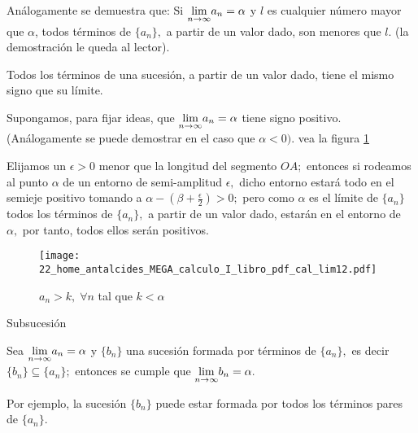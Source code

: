Análogamente se demuestra que: Si $\Lim{a_{n}}n{\infty}=\alpha$ y
$l$ es cualquier número mayor que $\alpha$, todos términos de $\{a_{n}\},$
a partir de un valor dado, son menores que $l$. (la demostración
le queda al lector).

\begin{propiedad}{}

Todos los términos de una sucesión, a partir de un valor dado, tiene
el mismo signo que su límite. 

\end{propiedad}

\begin{dems}

Supongamos, para fijar ideas, que $\Lim{a_{n}}n{\infty}=\alpha$ tiene
signo positivo. (Análogamente se puede demostrar en el caso que $\alpha<0).$
vea la figura \ref{fig:cal_lim12}

Elijamos un $\epsilon>0$ menor que la longitud del segmento $OA;$
entonces si rodeamos al punto $\alpha$ de un entorno de semi-amplitud
$\epsilon,$ dicho entorno estará todo en el semieje positivo tomando
a $\alpha-(\beta+\frac{\epsilon}{2})>0;$ pero como $\alpha$ es el
límite de $\{a_{n}\}$ todos los términos de $\{a_{n}\},$ a partir
de un valor dado, estarán en el entorno de $\alpha,$ por tanto, todos
ellos serán positivos.

\end{dems}

\begin{figure}[H] \centering

\texttt{[image: 22\_home\_antalcides\_MEGA\_calculo\_I\_libro\_pdf\_cal\_lim12.pdf]}
\caption{$a_n>k,\;\forall n$ tal que $k<\alpha $}
\label{fig:cal_lim12} \end{figure}

\begin{propiedad}{Subsucesión\label{prop:subsucesion}}

Sea $\Lim{a_{n}}n{\infty}=\alpha$ y $\{b_{n}\}$ una sucesión formada
por términos de $\{a_{n}\},$ es decir $\{b_{n}\}\subseteq\{a_{n}\};$
entonces se cumple que $\Lim{b_{n}}n{\infty}=\alpha.$ 

\end{propiedad}

Por ejemplo, la sucesión $\{b_{n}\}$ puede estar formada por todos
los términos pares de $\{a_{n}\}.$

